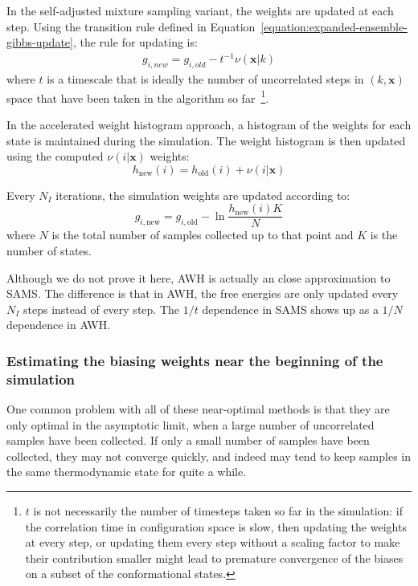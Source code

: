 \documentclass[9pt,review]{livecoms}
\newcommand{\vx}{\mathbf{x}}
\begin{document}
In the self-adjusted mixture sampling variant, the weights are updated at each step. Using the transition rule defined in Equation~\ref{equation:expanded-ensemble-gibbs-update}, the rule for updating is:
\begin{eqnarray}
g_{i,new} = g_{i,old} - t^{-1}\nu(\vx|k)
\end{eqnarray}
where $t$ is a timescale that is ideally the number of uncorrelated steps in $(k,\vx)$ space that have been taken in the algorithm so far~\footnote{$t$ is not necessarily the number of timesteps taken so far in the simulation: if the correlation time in configuration space is slow, then updating the weights at every step, or updating them every step without a scaling factor to make their contribution smaller might lead to premature convergence of the biases on a subset of the conformational states.}.

In the accelerated weight histogram approach, a histogram of the weights for each state is maintained during the simulation. The weight histogram is then updated using the computed $\nu(i|\vx)$ weights:
\begin{equation}
h_{\mathrm{new}}(i) = h_{\mathrm{old}}(i) + \nu(i|\vx)
\label{eq:awh-weight-histogram}
\end{equation}

Every $N_I$ iterations, the simulation weights are updated according to:
\begin{equation}
g_{i,\mathrm{new}} = g_{i,\mathrm{old}} - \ln{\frac{h_{\mathrm{new}}(i)K}{N}}
\label{eq:awh_free_energy_up}
\end{equation}
where $N$ is the total number of samples collected up to that point and $K$ is the number of states.


Although we do not prove it here, AWH is actually an close approximation to SAMS. The difference is that in AWH, the free energies are only updated every $N_I$ steps instead of every step. The $1/t$ dependence in SAMS shows up as a $1/N$ dependence in AWH.

\subsubsection{Estimating the biasing weights near the beginning of the simulation}

One common problem with all of these near-optimal methods is that they are only optimal in the asymptotic limit, when a large number of uncorrelated samples have been collected.  If only a small number of samples have been collected, they may not converge quickly, and indeed may tend to keep samples in the same thermodynamic state for quite a while.
\end{document}
